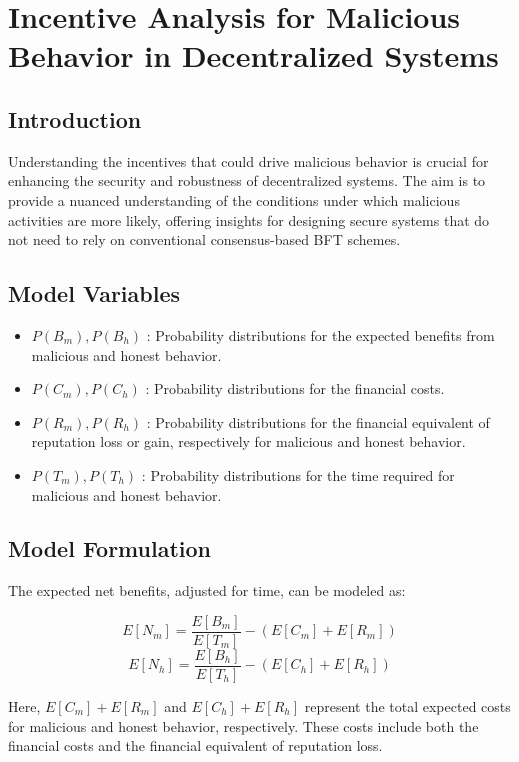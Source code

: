 \section{Incentive Analysis for Malicious Behavior in Decentralized Systems}
\label{sec:math_model}

\subsection{Introduction}

Understanding the incentives that could drive malicious behavior is crucial for enhancing the security and robustness of decentralized systems. The aim is to provide a nuanced understanding of the conditions under which malicious activities are more likely, offering insights for designing secure systems that do not need to rely on conventional consensus-based BFT schemes.

\subsection{Model Variables}

\begin{itemize}
    \item \( P(B_m), P(B_h) \) : Probability distributions for the expected benefits from malicious and honest behavior.
    \item \( P(C_m), P(C_h) \) : Probability distributions for the financial costs.
    \item \( P(R_m), P(R_h) \) : Probability distributions for the financial equivalent of reputation loss or gain, respectively for malicious and honest behavior.
    \item \( P(T_m), P(T_h) \) : Probability distributions for the time required for malicious and honest behavior.
\end{itemize}

\subsection{Model Formulation}

The expected net benefits, adjusted for time, can be modeled as:

\[
    E[N_m] = \frac{E[B_m]}{E[T_m]} - (E[C_m] + E[R_m])
\]
\[
    E[N_h] = \frac{E[B_h]}{E[T_h]} - (E[C_h] + E[R_h])
\]

Here, \( E[C_m] + E[R_m] \) and \( E[C_h] + E[R_h] \) represent the total expected costs for malicious and honest behavior, respectively. These costs include both the financial costs and the financial equivalent of reputation loss.

